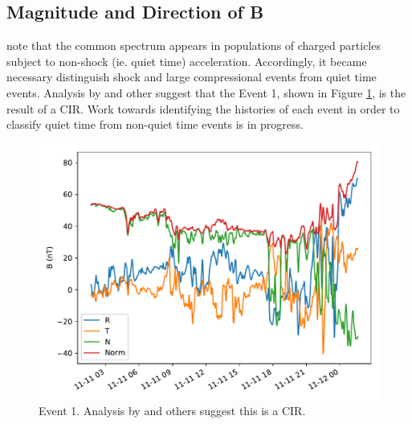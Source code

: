 \documentclass[letterpaper,11pt]{article}
\begin{document}
\subsection{Magnitude and Direction of B}
\citet{Fisk2008} note that the common spectrum appears in populations of charged particles subject to non-shock (ie. quiet time) acceleration.  Accordingly, it became necessary distinguish shock and large compressional events from quiet time events.  Analysis by \citet{Cohen2020} and other suggest that the Event 1, shown in Figure \ref{fig:b_rtn_01}, is the result of a CIR.  Work towards identifying the histories of each event in order to classify quiet time from non-quiet time events is in progress.


\begin{figure}[htbp]
\centering
\includegraphics[width=0.75\linewidth]{figures/B_RTN_01.pdf}
\caption{Event 1. Analysis by \citet{Cohen2020} and others suggest this is a CIR.}
\label{fig:b_rtn_01}
\end{figure}

\end{document}
